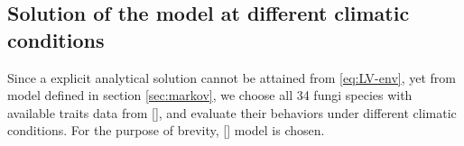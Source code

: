 \subsection{Solution of the model at different climatic conditions}

Since a explicit analytical solution cannot be attained from \eqref{eq:LV-env}, yet from model defined in section \ref{sec:markov}, we choose all 34 fungi species with available traits data from [], and evaluate their behaviors under different climatic conditions. For the purpose of brevity, [] model is chosen.

